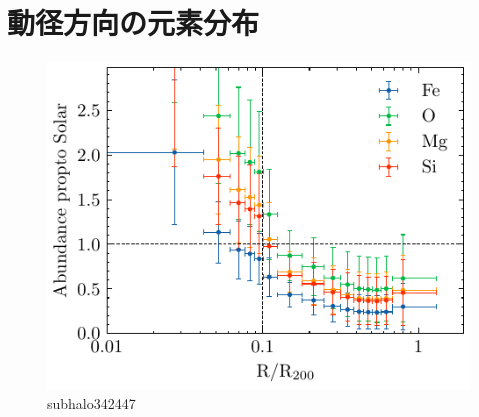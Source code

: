 \documentclass[main.tex]{subfiles}
\begin{document}
	\section{動径方向の元素分布}
	
	\begin{figure}[htbp]
		\centering
		\includegraphics[width=0.7\linewidth]{pic/abundance_profile342447}
		\captionsetup{width=.9\linewidth}
		\caption{subhalo342447}
		\label{fig:abundanceprofile342447}
	\end{figure}
	
\end{document}
